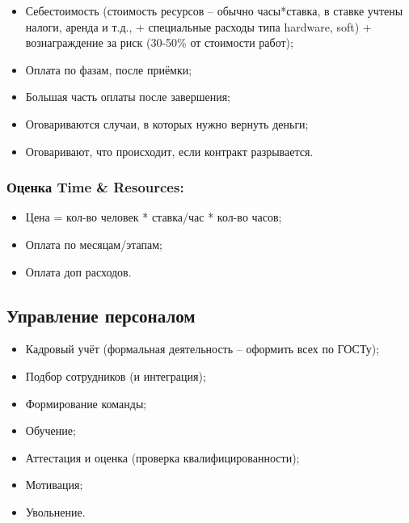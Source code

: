 \documentclass[a4paper,8pt]{article}
\begin{document}
    \begin{itemize}
        \item Себестоимость (стоимость ресурсов -- обычно часы*ставка, в ставке учтены налоги, аренда и т.д., + специальные расходы типа hardware, soft) + вознаграждение за риск (30-50\% от стоимости работ);
        \item Оплата по фазам, после приёмки;
        \item Большая часть оплаты после завершения;
        \item Оговариваются случаи, в которых нужно вернуть деньги;
        \item Оговаривают, что происходит, если контракт разрывается.
    \end{itemize}

\subsubsection{Оценка Time \& Resources:}

    \begin{itemize}

        \item Цена = кол-во человек * ставка/час * кол-во часов;
        \item Оплата по месяцам/этапам;
        \item Оплата доп расходов.
    \end{itemize}



\subsection{Управление персоналом}

    \begin{itemize}
        \item Кадровый учёт (формальная деятельность -- оформить всех по ГОСТу);
        \item Подбор сотрудников (и интеграция);
        \item Формирование команды;
        \item Обучение;
        \item Аттестация и оценка (проверка квалифицированности);
        \item Мотивация;
        \item Увольнение.
    \end{itemize}
\end{document}
